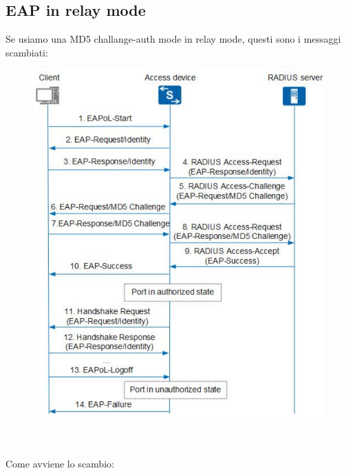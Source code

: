 \documentclass[12pt, oneside]{extbook} %
\begin{document}
\subsection{EAP in relay mode}
Se usiamo una MD5 challange-auth mode in relay mode, questi sono i messaggi scambiati:\\
    \begin{figure}[h!]
        \centering
        \includegraphics[scale=0.4]{../../immagini/eap_relay}
    \end{figure}
\\\\Come avviene lo scambio:
\end{document}
